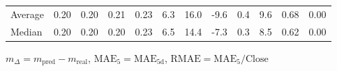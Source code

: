 \begin{threeparttable}
{\begin{tabular}{lrrrrrrrrrrr}
Average &          0.20 &          0.20 &          0.21 &        0.23 &                 6.3 &                16.0 &       -9.6 &                 0.4 &              9.6 &            0.68 &                   0.00 \\
 Median &          0.20 &          0.20 &          0.20 &        0.23 &                 6.5 &                14.4 &       -7.3 &                 0.3 &              8.5 &            0.62 &                   0.00 \\
\bottomrule
\end{tabular}
}
\begin{tablenotes}\footnotesize
\item $m_\Delta=m_{\text{pred}}-m_{\text{real}}$,
$\mathrm{MAE}_5=\mathrm{MAE}_{5\text{d}}$,
$\mathrm{RMAE}=\mathrm{MAE}_5/\text{Close}$
\end{tablenotes}
\end{threeparttable}
\endgroup

